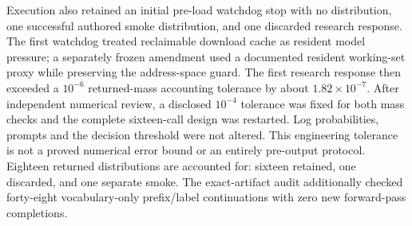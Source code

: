 Execution also retained an initial pre-load watchdog stop with no distribution,
one successful authored smoke distribution, and one discarded research
response. The first watchdog treated reclaimable download cache as resident
model pressure; a separately frozen amendment used a documented resident
working-set proxy while preserving the address-space guard. The first research
response then exceeded a $10^{-6}$ returned-mass accounting tolerance by about
$1.82\times10^{-7}$. After independent numerical review, a disclosed $10^{-4}$
tolerance was fixed for both mass checks and the complete sixteen-call design
was restarted. Log probabilities, prompts and the decision threshold were not
altered. This engineering tolerance is not a proved numerical error bound or
an entirely pre-output protocol. Eighteen returned distributions are accounted
for: sixteen retained, one discarded, and one separate smoke. The exact-artifact
audit additionally checked forty-eight vocabulary-only prefix/label
continuations with zero new forward-pass completions.
